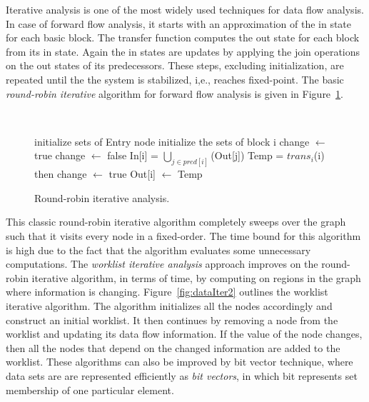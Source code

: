 Iterative analysis is one of the most widely used techniques for data flow analysis. 
In case of forward flow analysis, it starts with an approximation of 
the in state for each basic block. The transfer 
function computes the out state for each block from its in state. Again 
the in states are updates by applying the join operations on the out 
states of its predecessors. These steps, excluding initialization, are repeated 
until the the system is stabilized, i,e., reaches fixed-point. The basic 
\emph{round-robin iterative} algorithm for forward flow analysis is given in Figure~\ref{fig:dataIter1}.
\begin{figure}
\begin{framed}
{\tt
  \begin{program}{0}
   initialize sets of Entry node
   
   initialize the sets of block i
   change $\leftarrow$ true
   
   change $\leftarrow$ false
   
   In[i] = $\bigcup_{j\in{pred[i]}}$(Out[j])
   Temp = $trans_i$(i)
    then 
   change $\leftarrow$ true
   Out[i] $\leftarrow$ Temp
  \end{program}
}
\end{framed}
  \caption{Round-robin iterative analysis. \label{fig:dataIter1}}
\end{figure}
%
This classic round-robin iterative algorithm completely sweeps over the graph such that it visits every node in a fixed-order. 
The time bound for this algorithm is high due to the fact that 
the algorithm evaluates some unnecessary computations. 
The \emph{worklist iterative analysis} approach improves on the round-robin iterative algorithm, in 
terms of time, by computing on regions in the graph where information 
is changing. Figure~\ref{fig:dataIter2} outlines the worklist iterative 
algorithm. The algorithm initializes all the nodes accordingly 
and construct an initial worklist. It then continues by removing 
a node from the worklist and updating its data flow information. 
If the value of the node changes, then all the nodes that 
depend on the changed information are added to the worklist. 
These algorithms can also be improved by bit vector technique, 
where data sets are are represented efficiently as \emph{bit vectors}, 
in which bit represents set membership of one particular element.
